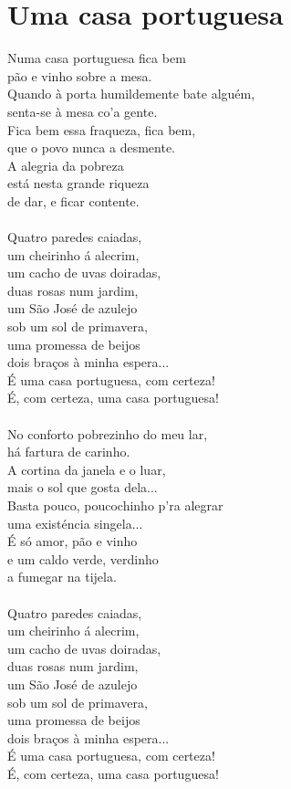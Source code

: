\documentclass{article}
\begin{document}
\section{ Uma casa portuguesa}
Numa casa portuguesa fica bem\\
pão e vinho sobre a mesa.\\
Quando à porta humildemente bate alguém,\\
senta-se à mesa co'a gente.\\
Fica bem essa fraqueza, fica bem,\\
que o povo nunca a desmente.\\
A alegria da pobreza\\
está nesta grande riqueza\\
de dar, e ficar contente.\\
\\
Quatro paredes caiadas,\\
um cheirinho á alecrim,\\
um cacho de uvas doiradas,\\
duas rosas num jardim,\\
um São José de azulejo\\
sob um sol de primavera,\\
uma promessa de beijos\\
dois braços à minha espera...\\
É uma casa portuguesa, com certeza!\\
É, com certeza, uma casa portuguesa!\\
\\
No conforto pobrezinho do meu lar,\\
há fartura de carinho.\\
A cortina da janela e o luar,\\
mais o sol que gosta dela...\\
Basta pouco, poucochinho p'ra alegrar\\
uma existéncia singela...\\
É só amor, pão e vinho\\
e um caldo verde, verdinho\\
a fumegar na tijela.\\
\\
Quatro paredes caiadas,\\
um cheirinho á alecrim,\\
um cacho de uvas doiradas,\\
duas rosas num jardim,\\
um São José de azulejo\\
sob um sol de primavera,\\
uma promessa de beijos\\
dois braços à minha espera...\\
É uma casa portuguesa, com certeza!\\
É, com certeza, uma casa portuguesa!\\
\\
\\
\\
\end{document}
